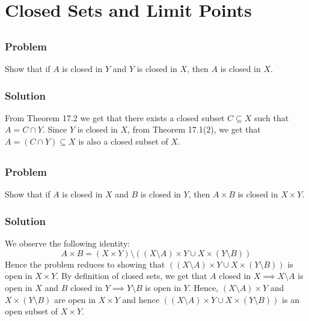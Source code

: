 \setcounter{section}{16} %
\section{Closed Sets and Limit Points}
\label{sec-topspace-closed}


\setcounter{subsection}{1} %
\subsection{}

\subsubsection{Problem}
Show that if $A$ is closed in $Y$ and $Y$ is closed in $X$, then $A$ is closed in $X$.
\subsubsection{Solution}
From Theorem 17.2 we get that there exists a closed subset $C \subseteq X$ such that $A = C \cap Y$. Since $Y$ is closed in $X$, from Theorem 17.1(2), we get that $A = (C \cap Y) \subseteq X$ is also a closed subset of $X$.


\setcounter{subsection}{2} %
\subsection{}

\subsubsection{Problem}
Show that if $A$ is closed in $X$ and $B$ is closed in $Y$, then $A \times B$ is closed in $X \times Y$.
\subsubsection{Solution}
We observe the following identity:
\[ A \times B = (X \times Y) \setminus ((X\setminus A) \times Y \cup X \times (Y \setminus B)) \]
Hence the problem reduces to showing that $((X\setminus A) \times Y \cup X \times (Y \setminus B))$ is open in $X \times Y$.
By definition of closed sets, we get that $A$ closed in $X \implies X\setminus A$ is open in $X$ and $B$ closed in $Y \implies Y\setminus B$ is open in $Y$. Hence, $(X\setminus A) \times Y$ and $X \times (Y \setminus B)$ are open in $X \times Y$ and hence $((X\setminus A) \times Y \cup X \times (Y \setminus B))$ is an open subset of $X \times Y$.

